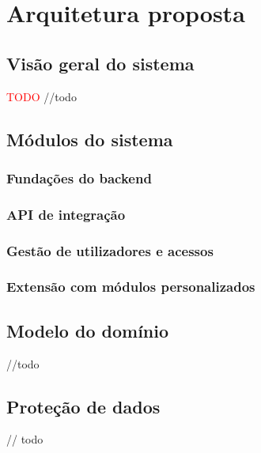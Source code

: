 \chapter{Arquitetura proposta}

\section{Visão geral do sistema}
\textcolor{red}{{\huge TODO}}
//todo
\section{Módulos do sistema}
\subsection{Fundações do backend}
\subsection{API de integração}
\subsection{Gestão de utilizadores e acessos}
\subsection{Extensão com módulos personalizados}


\section{Modelo do domínio}
//todo

\section{Proteção de dados}

// todo

\cleardoublepage